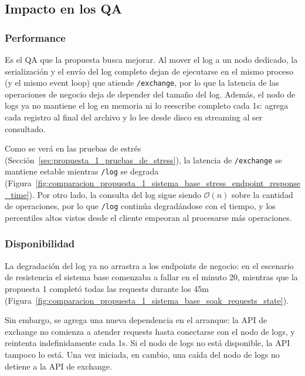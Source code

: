     \subsection{Impacto en los QA}
    \label{sec:propuesta_1_impacto_en_los_qa}

        \subsubsection{Performance}
        \label{sec:propuesta_1_performance}

        Es el QA que la propuesta busca mejorar. Al mover el log a un nodo dedicado, la serialización y el envío del log
        completo dejan de ejecutarse en el mismo proceso (y el mismo event loop) que atiende \texttt{/exchange}, por lo que
        la latencia de las operaciones de negocio deja de depender del tamaño del log. Además, el nodo de logs ya no mantiene
        el log en memoria ni lo reescribe completo cada 1s: agrega cada registro al final del archivo y lo lee desde disco
        en streaming al ser consultado.

        Como se verá en las pruebas de estrés (Sección~\ref{sec:propuesta_1_pruebas_de_stress}), la latencia de \texttt{/exchange}
        se mantiene estable mientras \texttt{/log} se degrada
        (Figura~\ref{fig:comparacion_propuesta_1_sistema_base_stress_endpoint_response_time}). Por otro lado, la consulta del log
        sigue siendo $\mathcal{O}(n)$ sobre la cantidad de operaciones, por lo que \texttt{/log} continúa degradándose con el tiempo, y los
        percentiles altos vistos desde el cliente empeoran al procesarse más operaciones.

        \subsubsection{Disponibilidad}
        \label{sec:propuesta_1_disponibilidad}

        La degradación del log ya no arrastra a los endpoints de negocio: en el escenario de resistencia el sistema base
        comenzaba a fallar en el minuto 20, mientras que la propuesta 1 completó todas las requests durante los 45m
        (Figura~\ref{fig:comparacion_propuesta_1_sistema_base_soak_requests_state}).

        Sin embargo, se agrega una nueva dependencia en el arranque: la API de exchange no comienza a atender requests hasta
        conectarse con el nodo de logs, y reintenta indefinidamente cada 1s. Si el nodo de logs no está disponible, la
        API tampoco lo está. Una vez iniciada, en cambio, una caída del nodo de logs no detiene a la API de exchange.

